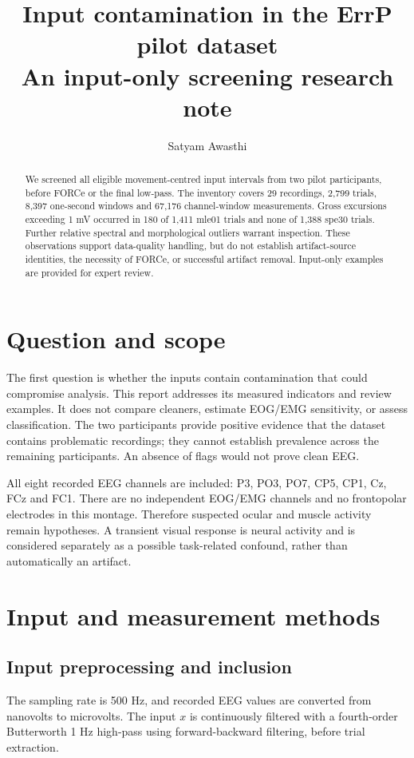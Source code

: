 \documentclass[11pt,a4paper]{article}
\title{Input contamination in the ErrP pilot dataset\\\large An input-only screening research note}
\author{Satyam Awasthi}\date{}
\begin{document}
\maketitle
\begin{abstract}
We screened all eligible movement-centred input intervals from two pilot participants, before FORCe or the final low-pass. The inventory covers 29 recordings, 2,799 trials, 8,397 one-second windows and 67,176 channel-window measurements. Gross excursions exceeding 1 mV occurred in 180 of 1,411 mle01 trials and none of 1,388 spe30 trials. Further relative spectral and morphological outliers warrant inspection. These observations support data-quality handling, but do not establish artifact-source identities, the necessity of FORCe, or successful artifact removal. Input-only examples are provided for expert review.
\end{abstract}
\section{Question and scope}
The first question is whether the inputs contain contamination that could compromise analysis. This report addresses its measured indicators and review examples. It does not compare cleaners, estimate EOG/EMG sensitivity, or assess classification. The two participants provide positive evidence that the dataset contains problematic recordings; they cannot establish prevalence across the remaining participants. An absence of flags would not prove clean EEG.

All eight recorded EEG channels are included: P3, PO3, PO7, CP5, CP1, Cz, FCz and FC1. There are no independent EOG/EMG channels and no frontopolar electrodes in this montage. Therefore suspected ocular and muscle activity remain hypotheses. A transient visual response is neural activity and is considered separately as a possible task-related confound, rather than automatically an artifact.
\section{Input and measurement methods}
\subsection{Input preprocessing and inclusion}
The sampling rate is 500 Hz, and recorded EEG values are converted from nanovolts to microvolts. The input $x$ is continuously filtered with a fourth-order Butterworth 1 Hz high-pass using forward-backward filtering, before trial extraction.
\end{document}
